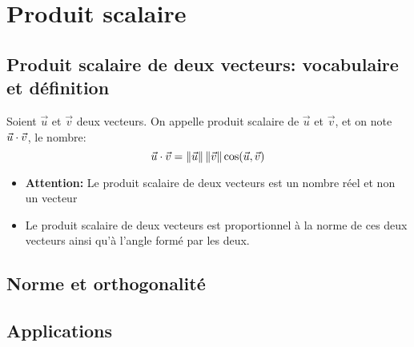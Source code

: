 \chapter{Produit scalaire}

\section{Produit scalaire de deux vecteurs: vocabulaire et définition}
\begin{mydef}
  Soient $\vec{u}$ et $\vec{v}$ deux vecteurs. On appelle produit scalaire de
  $\vec{u}$ et $\vec{v}$, et on note $\vec{u} \cdot \vec{v}$, le nombre:
  \[
    \vec{u} \cdot \vec{v} = \left \Vert {\vec{u}} \right \Vert \left \Vert {\vec{v}} \right \Vert \cos(\vec{u},\vec{v})
  \]
\end{mydef}

\begin{Rem}
  \begin{itemize}[label=$\bullet$, leftmargin=2cm]
  \item \textbf{Attention: } Le produit scalaire de deux vecteurs est un nombre
    réel et non un vecteur
  \item Le produit scalaire de deux vecteurs est proportionnel à la norme de ces
    deux vecteurs ainsi qu'à l'angle formé par les deux.
  \end{itemize}
\end{Rem}

\section{Norme et orthogonalité}

\section{Applications}


